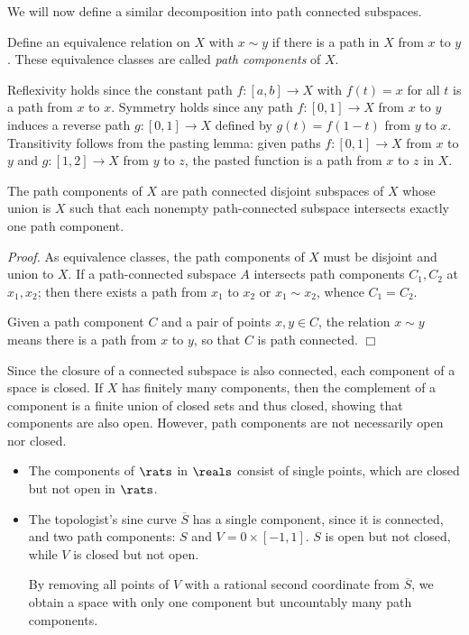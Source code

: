 We will now define a similar decomposition into path connected subspaces.
\begin{definition}\label{3.15}
    Define an equivalence relation on $X$ with $x \sim y$ if there is a path in $X$ from $x$ to $y$. These equivalence classes are called {\it path components} of $X$.
\end{definition}
Reflexivity holds since the constant path $f: [a, b] \rightarrow X$ with $f(t) = x$ for all $t$ is a path from $x$ to $x$. Symmetry holds since any path $f: [0, 1] \rightarrow X$ from $x$ to $y$ induces a reverse path $g: [0, 1] \rightarrow X$ defined by $g(t) = f(1-t)$ from $y$ to $x$. Transitivity follows from the pasting lemma: given paths $f: [0, 1] \rightarrow X$ from $x$ to $y$ and $g: [1, 2] \rightarrow X$ from $y$ to $z$, the pasted function is a path from $x$ to $z$ in $X$.
\begin{theorem}\label{3.16}
    The path components of $X$ are path connected disjoint subspaces of $X$ whose union is $X$ such that each nonempty path-connected subspace intersects exactly one path component.
\end{theorem}
{\it Proof.} As equivalence classes, the path components of $X$ must be disjoint and union to $X$. If a path-connected subspace $A$ intersects path components $C_1, C_2$ at $x_1, x_2$; then there exists a path from $x_1$ to $x_2$ or $x_1 \sim x_2$, whence $C_1 = C_2$.

Given a path component $C$ and a pair of points $x, y \in C$, the relation $x \sim y$ means there is a path from $x$ to $y$, so that $C$ is path connected. $\Box$

Since the closure of a connected subspace is also connected, each component of a space is closed. If $X$ has finitely many components, then the complement of a component is a finite union of closed sets and thus closed, showing that components are also open. However, path components are not necessarily open nor closed.
\begin{itemize}
    \item The components of $\rats$ in $\reals$ consist of single points, which are closed but not open in $\rats$.

    \item The topologist's sine curve $\overline{S}$ has a single component, since it is connected, and two path components: $S$ and $V = 0 \times [-1, 1]$. $S$ is open but not closed, while $V$ is closed but not open.

    By removing all points of $V$ with a rational second coordinate from $\overline{S}$, we obtain a space with only one component but uncountably many path components.
\end{itemize}

